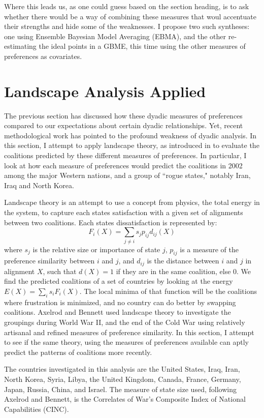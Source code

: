 \documentclass[12pt,onesided,fullpage]{amsart}
\begin{document}
Where this leads us, as one could guess based on the section heading, is to ask whether there would be a way of combining these measures that woul accentuate their strengths and hide some of the weaknesses. I propose two such syntheses: one using Ensemble Bayesian Model Averaging (EBMA), and the other re-estimating the ideal points in a GBME, this time using the other measures of preferences as covariates.

\section{Landscape Analysis Applied}
The previous section has discussed how these dyadic measures of preferences compared to our expectations about certain dyadic relationships. Yet, recent methodological work has pointed to the profound weakness of dyadic analysis. In this section, I attempt to apply landscape theory, as introduced in \citep{axelrod:bennett:1992} to evaluate the coalitions predicted by these different measures of preferences. In particular, I look at how each measure of preferences would predict the coalitions in 2002 among the major Western nations, and a group of ``rogue states," notably Iran, Iraq and North Korea.

Landscape theory is an attempt to use a concept from physics, the total energy in the system, to capture each states satisfaction with a given set of alignments between two coalitions. Each states dissatisfaction is represented by:
\begin{equation}
F_i(X) = \sum_{j \neq i} s_j p_{ij} d_{ij} (X)
\end{equation}
where $s_j$ is the relative size or importance of state $j$, $p_{ij}$ is a measure of the preference similarity between $i$ and $j$, and $d_{ij}$ is the distance between $i$ and $j$ in alignment $X$, such that $d(X) = 1$ if they are in the same coalition, else $0$. We find the predicted coalitions of a set of countries by looking at the energy $E(X) = \sum_{i} s_i F_i(X)$. The local minima of that function will be the coalitions where frustration is minimized, and no country can do better by swapping coalitions. Axelrod and Bennett used landscape theory to investigate the groupings during World War II, and the end of the Cold War using relatively artisanal and refined measures of preference similarity. In this section, I attempt to see if the same theory, using the measures of preferences available can aptly predict the patterns of coalitions more recently.

The countries investigated in this analysis are the United States, Iraq, Iran, North Korea, Syria, Libya, the United Kingdom, Canada, France, Germany, Japan, Russia, China, and Israel. The measure of state size used, following Axelrod and Bennett, is the Correlates of War's Composite Index of National Capabilities (CINC). 
\end{document}
